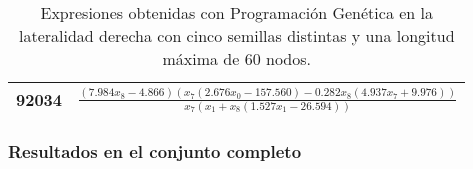 \begin{table}[H]
{\begin{tabular}{|c|c|}
92034            & $\frac{\left(7.984 x_{8} - 4.866\right) \left(x_{7} \left(2.676 x_{0} - 157.560\right) - 0.282 x_{8} \left(4.937 x_{7} + 9.976\right)\right)}{x_{7} \left(x_{1} + x_{8} \left(1.527 x_{1} - 26.594\right)\right)}$                                                                                                                                                                                         \\ \hline
\end{tabular}%
}
\caption{Expresiones obtenidas con Programación Genética en la lateralidad derecha con cinco semillas distintas y una longitud máxima de 60 nodos.}\label{table:exp_PG_l1_60}
\end{table}



\subsubsection{Resultados en el conjunto completo}


\begin{table}[H]
\centering
{}
\caption{Resultados de Programación Genética en el conjunto de datos completo con cinco semillas distintas y una longitud máxima de 20 nodos.}\label{table:resultados_PG_c_20}
\end{table}


